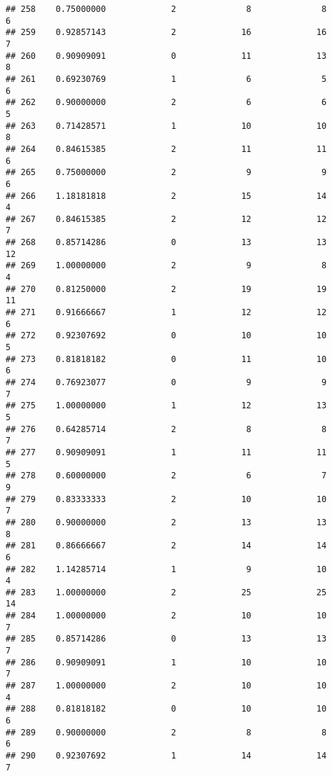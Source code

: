 \documentclass[
]{article}
\begin{document}
\begin{verbatim}
## 258    0.75000000             2              8              8              6
## 259    0.92857143             2             16             16              7
## 260    0.90909091             0             11             13              8
## 261    0.69230769             1              6              5              6
## 262    0.90000000             2              6              6              5
## 263    0.71428571             1             10             10              8
## 264    0.84615385             2             11             11              6
## 265    0.75000000             2              9              9              6
## 266    1.18181818             2             15             14              4
## 267    0.84615385             2             12             12              7
## 268    0.85714286             0             13             13             12
## 269    1.00000000             2              9              8              4
## 270    0.81250000             2             19             19             11
## 271    0.91666667             1             12             12              6
## 272    0.92307692             0             10             10              5
## 273    0.81818182             0             11             10              6
## 274    0.76923077             0              9              9              7
## 275    1.00000000             1             12             13              5
## 276    0.64285714             2              8              8              7
## 277    0.90909091             1             11             11              5
## 278    0.60000000             2              6              7              9
## 279    0.83333333             2             10             10              7
## 280    0.90000000             2             13             13              8
## 281    0.86666667             2             14             14              6
## 282    1.14285714             1              9             10              4
## 283    1.00000000             2             25             25             14
## 284    1.00000000             2             10             10              7
## 285    0.85714286             0             13             13              7
## 286    0.90909091             1             10             10              7
## 287    1.00000000             2             10             10              4
## 288    0.81818182             0             10             10              6
## 289    0.90000000             2              8              8              6
## 290    0.92307692             1             14             14              7

\end{verbatim}
\end{document}
